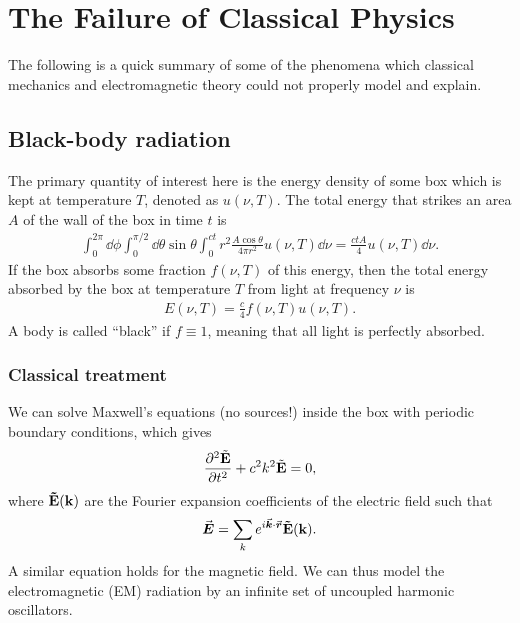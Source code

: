 \chapter{The Failure of Classical Physics}

The following is a quick summary of some of the phenomena which classical mechanics and electromagnetic theory could not properly model and explain.

\section{Black-body radiation}

The primary quantity of interest here is the energy density of some box which is kept at temperature $T$, denoted as $u(\nu,T)$.
The total energy that strikes an area $A$ of the wall of the box in time $t$ is
\begin{eqnarray}
    \int_{0}^{2 \pi} \dd{\phi} \int_{0}^{\pi/2} \dd{\theta} \sin{\theta} \int_{0}^{ct} r^2 \frac{A \cos{\theta}}{4 \pi r^2} u(\nu,T) \dd{\nu} = \frac{c t A}{4} u(\nu,T) \dd{\nu}
.\end{eqnarray}
If the box absorbs some fraction $f(\nu,T)$ of this energy, then the total energy absorbed by the box at temperature $T$ from light at frequency $\nu$ is
\begin{eqnarray}
    E(\nu,T) = \frac{c}{4} f(\nu,T) u(\nu,T)
.\end{eqnarray}
A body is called ``black'' if $f \equiv 1$, meaning that all light is perfectly absorbed.

\subsection{Classical treatment}

We can solve Maxwell's equations (no sources!) inside the box with periodic boundary conditions, which gives
\begin{eqnarray}
    \pdv[2]{\tilde{\bf{E}}}{t} + c^2 k^2 \tilde{\bf{E}} = 0
,\end{eqnarray}
where $\bf{\tilde{E}}(k)$ are the Fourier expansion coefficients of the electric field such that
\begin{eqnarray}
    \va*{E} = \sum_{k} e^{i \va*{k} \cdot \va*{r}} \bf{\tilde{E}}(k)
.\end{eqnarray}
A similar equation holds for the magnetic field.
We can thus model the electromagnetic (EM) radiation by an infinite set of uncoupled harmonic oscillators.

